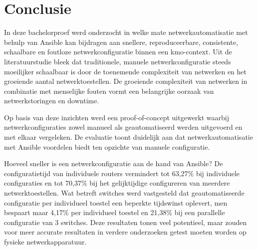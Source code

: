 
\chapter{Conclusie}%
\label{ch:conclusie}


In deze bachelorproef werd onderzocht in welke mate netwerkautomatisatie met behulp van Ansible kan bijdragen aan snellere, reproduceerbare, consistente, schaalbare en foutloze netwerkconfiguratie binnen een kmo-context.
Uit de literatuurstudie bleek dat traditionele, manuele netwerkconfiguratie steeds moeilijker schaalbaar is door de toenemende complexiteit van netwerken en het groeiende aantal netwerktoestellen.
De groeiende complexiteit van netwerken in combinatie met menselijke fouten vormt een belangrijke oorzaak van netwerkstoringen en downtime.

Op basis van deze inzichten werd een proof-of-concept uitgewerkt waarbij netwerkconfiguraties zowel manueel als geautomatiseerd werden uitgevoerd en met elkaar vergeleken.
De evaluatie toont duidelijk aan dat netwerkautomatisatie met Ansible voordelen biedt ten opzichte van manuele configuratie.
\vspace{1em}

Hoeveel sneller is een netwerkconfiguratie aan de hand van Ansible?
De configuratietijd van individuele routers vermindert tot 63,27\% bij individuele configuraties en tot 70,37\% bij het gelijktijdige configureren van meerdere netwerktoestellen.
Wat betreft switches werd vastgesteld dat geautomatiseerde configuratie per individueel toestel een beperkte tijdswinst oplevert, men bespaart maar 4,17\% per individueel toestel en 21,38\% bij een parallelle configuratie van 3 switches.
Deze resultaten tonen veel potentieel, maar zouden voor meer accurate resultaten in verdere onderzoeken getest moeten worden op fysieke netwerkapparatuur.
\vspace{1em}

